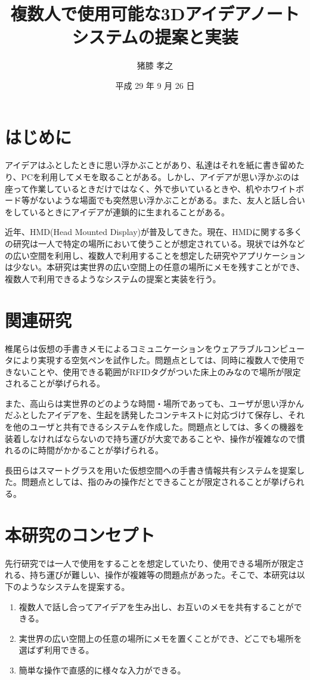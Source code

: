 \documentclass[twocolumn, a4paper]{UECIEresume}
\title{複数人で使用可能な3Dアイデアノートシステムの提案と実装}
\date{平成 29 年 9 月 26 日}
\affiliation{情報学専攻 メディア情報学プログラム}
\author{猪膝 孝之}
\begin{document}
\maketitle

\section{はじめに}
アイデアはふとしたときに思い浮かぶことがあり、私達はそれを紙に書き留めたり、PCを利用してメモを取ることがある。しかし、アイデアが思い浮かぶのは座って作業しているときだけではなく、外で歩いているときや、机やホワイトボード等がないような場面でも突然思い浮かぶことがある。また、友人と話し合いをしているときにアイデアが連鎖的に生まれることがある。

近年、HMD(Head Mounted Display)が普及してきた。現在、HMDに関する多くの研究は一人で特定の場所において使うことが想定されている。現状では外などの広い空間を利用し、複数人で利用することを想定した研究やアプリケーションは少ない。本研究は実世界の広い空間上の任意の場所にメモを残すことができ、複数人で利用できるようなシステムの提案と実装を行う。

\section{関連研究}
椎尾ら\cite{tex1,tex2}は仮想の手書きメモによるコミュニケーションをウェアラブルコンピュータにより実現する空気ペンを試作した。問題点としては、同時に複数人で使用できないことや、使用できる範囲がRFIDタグがついた床上のみなので場所が限定されることが挙げられる。

また、高山ら\cite{tex3,tex4}は実世界のどのような時間・場所であっても、ユーザが思い浮かんだふとしたアイデアを、生起を誘発したコンテキストに対応づけて保存し、それを他のユーザと共有できるシステムを作成した。問題点としては、多くの機器を装着しなければならないので持ち運びが大変であることや、操作が複雑なので慣れるのに時間がかかることが挙げられる。

長田ら\cite{tex5}はスマートグラスを用いた仮想空間への手書き情報共有システムを提案した。問題点としては、指のみの操作だとできることが限定されることが挙げられる。


\section{本研究のコンセプト}
先行研究では一人で使用をすることを想定していたり、使用できる場所が限定される、持ち運びが難しい、操作が複雑等の問題点があった。そこで、本研究は以下のようなシステムを提案する。
\begin{enumerate}[(1)]
 \item 複数人で話し合ってアイデアを生み出し、お互いのメモを共有することができる。
 \item 実世界の広い空間上の任意の場所にメモを置くことができ、どこでも場所を選ばず利用できる。
 \item 簡単な操作で直感的に様々な入力ができる。
\end{enumerate}
\end{document}
